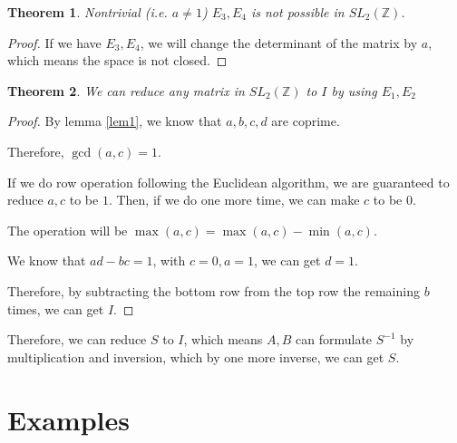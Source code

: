 \documentclass[11pt]{article}
\newcommand{\Z}{\mathbb{Z}}
\newtheorem{theorem}{Theorem}
\begin{document}
\begin{theorem}
	Nontrivial (i.e. \(a\neq 1\)) \(E_3, E_4\) is not possible in \(SL_2(\Z)\).
\end{theorem}
\begin{proof}
	If we have \(E_3, E_4\), we will change the determinant of the matrix by \(a\),
	which means the space is not closed.
	
\end{proof}


\begin{theorem}
	We can reduce any matrix in \(SL_2(\Z)\) to \(I\) by using \(E_1, E_2\)
\end{theorem}

\begin{proof}
	By lemma \ref{lem1}, we know that $a,b,c,d$ are coprime.

	Therefore, $\operatorname{gcd}(a,c)=1$.

	If we do row operation following the Euclidean algorithm,
	we are guaranteed to reduce $a,c$ to be $1$.
	Then, if we do one more time, we can make $c$ to be $0$.

	The operation will be \(\max(a,c)=\max(a,c)-\min(a,c)\).

	We know that $ad-bc=1$, with $c=0, a=1$, we can get $d=1$.

	Therefore, by subtracting the bottom row from the top row the remaining $b$ times,
	we can get $I$.
\end{proof}


Therefore, we can reduce $S$ to $I$, which means $A,B$ can 
	formulate $S^{-1}$ by multiplication and inversion, 
	which by one more inverse, we can get $S$.

\section*{Examples}
\end{document}
